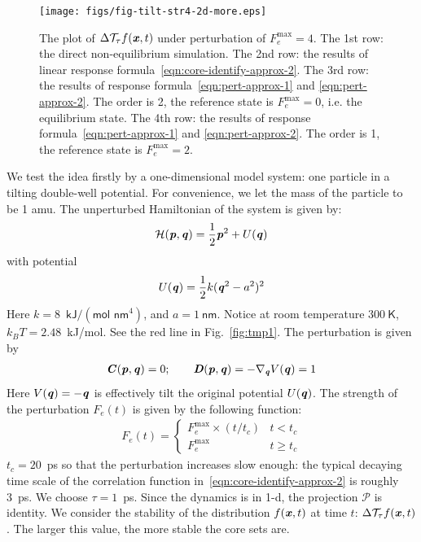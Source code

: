 \documentclass[aip,jcp,a4paper,reprint,onecolumn]{revtex4-1}
\newcommand{\vect}[1]{\textbf{\textit{#1}}}
\newcommand{\mh}{\mathcal H}
\newcommand{\mt}{\mathcal T}
\begin{document}
\begin{figure}
  \centering
  \texttt{[image: figs/fig-tilt-str4-2d-more.eps]}
  \caption{The plot of $\Delta\mt_\tau f(\vect x,t)$  under perturbation of
    $F_e^{\textrm{max}} = 4$.
    The 1st row: the direct non-equilibrium
    simulation. The 2nd row: the results of linear response
    formula~\eqref{eqn:core-identify-approx-2}.
    The 3rd row: the results of response
    formula~\eqref{eqn:pert-approx-1} and \eqref{eqn:pert-approx-2}.
    The order is 2, the reference state is $F_e^{\textrm{max}} = 0$, i.e.
    the equilibrium state.
    The 4th row: the results of response
    formula~\eqref{eqn:pert-approx-1} and \eqref{eqn:pert-approx-2}.
    The order is 1, the reference state is $F_e^{\textrm{max}} = 2$.
  }
  \label{fig:tmp3}
\end{figure}

We test the idea firstly by a one-dimensional model system: one particle in a
tilting double-well potential. For convenience, we let the mass of the
particle to be 1 \textsf{amu}. The unperturbed
Hamiltonian of the system is given by:
\begin{align}
  \mh (\vect p, \vect q) = \frac 12 \vect p^2 + U(\vect q) 
\end{align}
with potential
\begin{align}
  U(\vect q) = \frac12 k (\vect q^2 - a^2)^2
\end{align}
Here $k = 8$~$\textsf{kJ} / (\textsf{mol nm}^4)$, and $ a = 1\ \textsf{nm}$.
Notice at room temperature $300\ \textsf{K}$, $k_BT = 2.48$~\textsf{kJ/mol}.
See the red line in Fig.~\ref{fig:tmp1}.
The perturbation is given by
\begin{align}
  \vect C(\vect p, \vect q) = 0; \qquad
  \vect D(\vect p, \vect q) = -\nabla_{\vect q} V(\vect q) = 1
\end{align}
Here $V(\vect q) = -\vect q$ is  effectively tilt the original
potential $U(\vect q)$. The strength of the perturbation $F_e(t)$ is given
by the following function:
\begin{align}
  F_e(t) = 
  \begin{cases}
    F_e^{\textrm{max}}\times (t / t_c) & t < t_c \\
    F_e^{\textrm{max}} & t \geq t_c
  \end{cases}
\end{align}
$t_c = 20$~\textsf{ps} so that the perturbation increases slow
enough: the typical decaying time scale of the correlation function
in~\eqref{eqn:core-identify-approx-2} is roughly 3~\textsf{ps}.
We choose $\tau = 1$~\textsf{ps}.
Since the dynamics is in
1-d, the projection $\mathcal P$ is identity.  We consider the stability of the
distribution $f(\vect x, t)$ at time $t$: $\Delta\mt_\tau f(\vect x, t)$.
The larger
this value, the more stable the core sets are.
\end{document}

